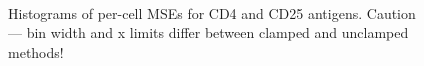 \begin{figure}
  \centering
  \quad
  \\
  \quad
  \caption{Histograms of per-cell MSEs for CD4 and CD25 antigens. Caution --- bin width and x limits differ between clamped and unclamped methods!}
  \label{fig:hists}
\end{figure}

